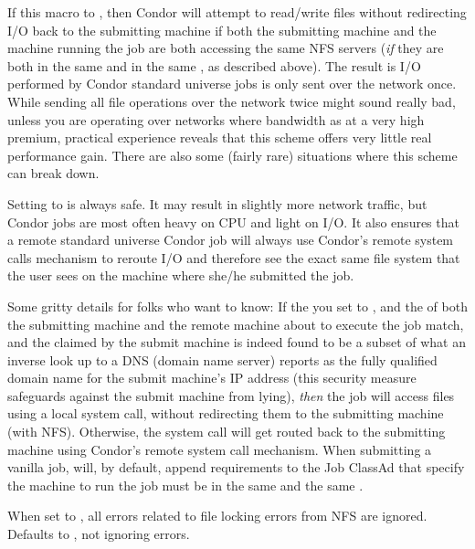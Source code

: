 \begin{description}
  If this macro to , then Condor will attempt to
  read/write files without redirecting I/O back to the submitting
  machine if both the submitting machine and the machine running the job
  are both accessing the same NFS servers (\emph{if} they are both in the
  same  and in the same ,
  as described above).  The result is I/O performed by Condor standard
  universe jobs is only sent over the network once.  
  While sending all file operations over the network twice might sound
  really bad, unless you are operating over networks where bandwidth
  as at a very high premium, practical experience reveals that this
  scheme offers very little real performance gain.  There are also
  some (fairly rare) situations where this scheme can break down.
  
  Setting  to  is always safe.  It may result
  in slightly more network traffic, but Condor jobs are most often heavy
  on CPU and light on I/O.  It also ensures that a remote
  standard universe Condor job will always use Condor's remote system
  calls mechanism to reroute I/O and therefore see the exact same
  file system that the user sees on the machine where she/he submitted
  the job.
  
  Some gritty details for folks who want to know: If the you set
   to , and the  of
  both the submitting machine and the remote machine about to execute
  the job match, and the  claimed by the
  submit machine is indeed found to be a subset of what an inverse
  look up to a DNS (domain name server) reports as the fully qualified
  domain name for the submit machine's IP address (this security
  measure safeguards against the submit machine from lying),
  \emph{then} the job will access files using a local system call,
  without redirecting them to the submitting machine (with
  NFS).  Otherwise, the system call will get routed back to the
  submitting machine using Condor's remote system call mechanism.
  \Note When submitting a vanilla job,  will, by default,
  append requirements to the Job ClassAd that specify the machine to run
  the job must be in the same  and the same
  .

\label{param:IgnoreNFSLockErrors}
\item[\Macro{IGNORE\_NFS\_LOCK\_ERRORS}]
  When set to , all errors related to file locking errors from
  NFS are ignored.
  Defaults to , not ignoring errors.
  

\end{description}
